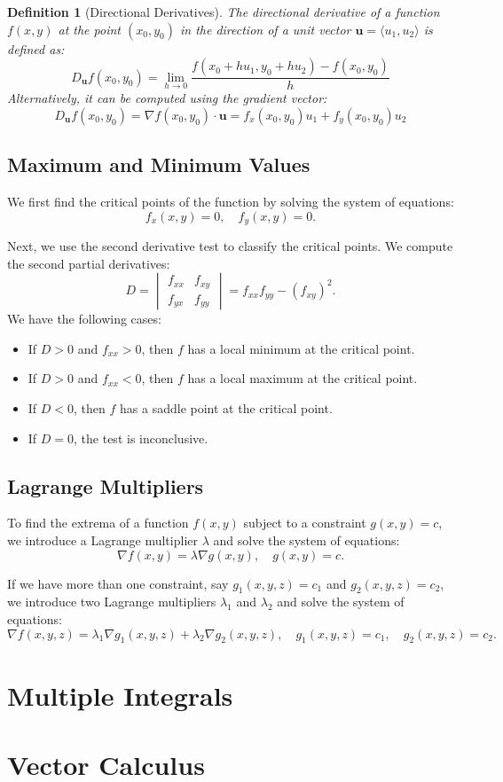 \documentclass{book}
\newtheorem{definition}{Definition}[chapter]
\theoremstyle{remark}
\begin{document}
\begin{definition}[Directional Derivatives]
    The directional derivative of a function $f(x, y)$ at the point $(x_0, y_0)$ in the direction of a unit vector $\mathbf{u} = \langle u_1, u_2 \rangle$ is defined as:
    \[
        D_{\mathbf{u}} f(x_0, y_0) = \lim_{h \to 0} \frac{f(x_0 + hu_1, y_0 + hu_2) - f(x_0, y_0)}{h}
    \]
    Alternatively, it can be computed using the gradient vector:
    \[
        D_{\mathbf{u}} f(x_0, y_0) = \nabla f(x_0, y_0) \cdot \mathbf{u} = f_x(x_0, y_0) u_1 + f_y(x_0, y_0) u_2
    \]
\end{definition}

\section{Maximum and Minimum Values}

We first find the critical points of the function by solving the system of equations:
\[
    f_x(x, y) = 0, \quad f_y(x, y) = 0.
\]

Next, we use the second derivative test to classify the critical points. We compute the second partial derivatives:
\[
    D = \begin{vmatrix}
        f_{xx} & f_{xy} \\
        f_{yx} & f_{yy}
    \end{vmatrix}
    = f_{xx} f_{yy} - (f_{xy})^2.
\]
We have the following cases:
\begin{itemize}
    \item If $D > 0$ and $f_{xx} > 0$, then $f$ has a local minimum at the critical point.
    \item If $D > 0$ and $f_{xx} < 0$, then $f$ has a local maximum at the critical point.
    \item If $D < 0$, then $f$ has a saddle point at the critical point.
    \item If $D = 0$, the test is inconclusive.
\end{itemize}

\section{Lagrange Multipliers}

To find the extrema of a function $f(x, y)$ subject to a constraint $g(x, y) = c$, we introduce a Lagrange multiplier $\lambda$ and solve the system of equations:
\[
    \nabla f(x, y) = \lambda \nabla g(x, y), \quad g(x, y) = c.
\]

If we have more than one constraint, say $g_1(x, y, z) = c_1$ and $g_2(x, y, z) = c_2$, we introduce two Lagrange multipliers $\lambda_1$ and $\lambda_2$ and solve the system of equations:
\[
    \nabla f(x, y, z) = \lambda_1 \nabla g_1(x, y, z) + \lambda_2 \nabla g_2(x, y, z), \quad g_1(x, y, z) = c_1, \quad g_2(x, y, z) = c_2.
\]

\chapter{Multiple Integrals}

\chapter{Vector Calculus}
\end{document}
